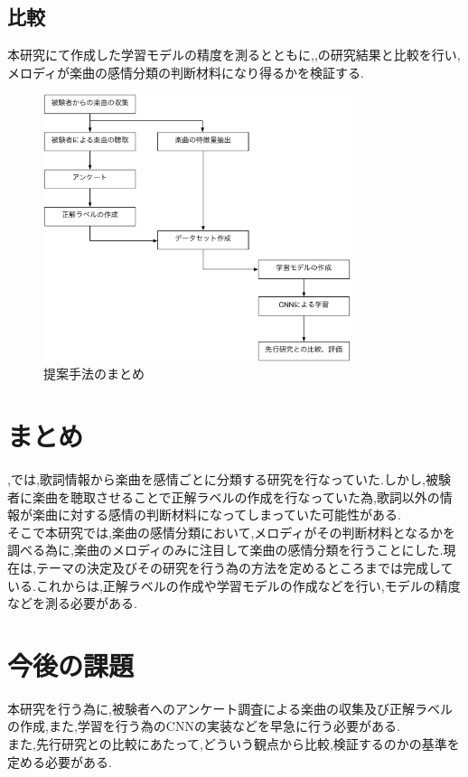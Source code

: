 \documentclass[twocolumn,twoside,9.5pt]{jarticle}
\begin{document}
\subsection{比較}
本研究にて作成した学習モデルの精度を測るとともに,\cite{gushiken1},\cite{gushiken2}の研究結果と比較を行い,メロディが楽曲の感情分類の判断材料になり得るかを検証する.

\begin{figure}[htbp]
	\includegraphics[width=90mm]{pic/flow.pdf}
	\caption{提案手法のまとめ}
	\label{f2}
\end{figure}

\section{まとめ}
\cite{gushiken1},\cite{gushiken2}では,歌詞情報から楽曲を感情ごとに分類する研究を行なっていた.しかし,被験者に楽曲を聴取させることで正解ラベルの作成を行なっていた為,歌詞以外の情報が楽曲に対する感情の判断材料になってしまっていた可能性がある.
\\そこで本研究では,楽曲の感情分類において,メロディがその判断材料となるかを調べる為に,楽曲のメロディのみに注目して楽曲の感情分類を行うことにした.現在は,テーマの決定及びその研究を行う為の方法を定めるところまでは完成している.これからは,正解ラベルの作成や学習モデルの作成などを行い,モデルの精度などを測る必要がある.

\section{今後の課題}
本研究を行う為に,被験者へのアンケート調査による楽曲の収集及び正解ラベルの作成,また,学習を行う為のCNNの実装などを早急に行う必要がある.\\
また,先行研究との比較にあたって,どういう観点から比較,検証するのかの基準を定める必要がある.
\end{document}
